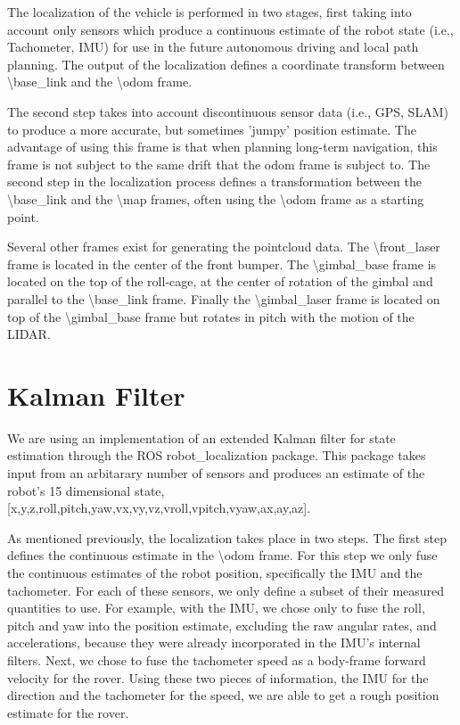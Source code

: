 The localization of the vehicle is performed in two stages, first taking into account only sensors which produce a continuous estimate of the robot state (i.e., Tachometer, IMU) for use in the future autonomous driving and local path planning. The output of the localization defines a coordinate transform between \textbackslash base\_link and the \textbackslash odom frame.

The second step takes into account discontinuous sensor data (i.e., GPS, SLAM) to produce a more accurate, but sometimes 'jumpy' position estimate. The advantage of using this frame is that when planning long-term navigation, this frame is not subject to the same drift that the odom frame is subject to. The second step in the localization process defines a transformation between the \textbackslash base\_link and the \textbackslash map frames, often using the \textbackslash odom frame as a starting point.

	Several other frames exist for generating the pointcloud data. The \textbackslash front\_laser frame is located in the center of the front bumper. The \textbackslash gimbal\_base frame is located on the top of the roll-cage, at the center of rotation of the gimbal and parallel to the \textbackslash base\_link frame. Finally the \textbackslash gimbal\_laser frame is located on top of the \textbackslash gimbal\_base frame but rotates in pitch with the motion of the LIDAR. 
\section{Kalman Filter}

We are using an implementation of an extended Kalman filter for state estimation through the ROS robot\_localization package. This package takes input from an arbitarary number of sensors and produces an estimate of the robot's 15 dimensional state, [x,y,z,roll,pitch,yaw,vx,vy,vz,vroll,vpitch,vyaw,ax,ay,az]\cite{Moore2016}. 

As mentioned previously, the localization takes place in two steps. The first step defines the continuous estimate in the \textbackslash odom frame. For this step we only fuse the continuous estimates of the robot position, specifically the IMU and the tachometer. For each of these sensors, we only define a subset of their measured quantities to use. For example, with the IMU, we chose only to fuse the roll, pitch and yaw into the position estimate, excluding the raw angular rates, and accelerations, because they were already incorporated in the IMU's internal filters. Next, we chose to fuse the tachometer speed as a body-frame forward velocity for the rover. Using these two pieces of information, the IMU for the direction and the tachometer for the speed, we are able to get a rough position estimate for the rover. 

